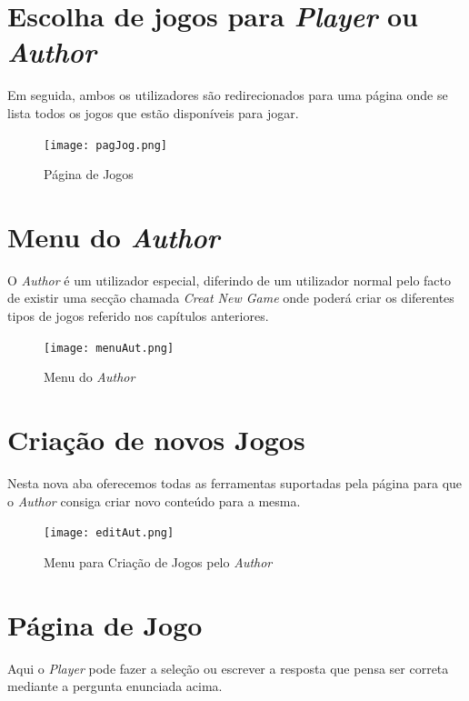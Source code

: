 \documentclass[11pt,a4paper]{report}
\begin{document}
\section{Escolha de jogos para \emph{Player} ou \emph{Author}}
Em seguida, ambos os utilizadores são redirecionados para uma página onde se lista todos os jogos que estão disponíveis para jogar.\newline\newline

\begin{figure}[h]
    \centering
    \texttt{[image: pagJog.png]}
    \caption{Página de Jogos}
    \label{fig:pagJog}
\end{figure}

\newpage

\section{Menu do \emph{Author}}
O \emph{Author} é um utilizador especial, diferindo de um utilizador normal pelo facto de existir uma secção chamada \emph{Creat New Game} onde poderá criar os diferentes tipos de jogos referido nos capítulos anteriores.\newline\newline

\begin{figure}[h]
    \centering
    \texttt{[image: menuAut.png]}
    \caption{Menu do \emph{Author}}
    \label{fig:menuAut}
\end{figure}

\section{Criação de novos Jogos}
Nesta nova aba oferecemos todas as ferramentas suportadas pela página para que o \emph{Author} consiga criar novo conteúdo para a mesma.\newline\newline

\begin{figure}[h]
    \centering
    \texttt{[image: editAut.png]}
    \caption{Menu para Criação de Jogos pelo \emph{Author}}
    \label{fig:editAut}
\end{figure}

\newpage

\section{Página de Jogo}
Aqui o \emph{Player} pode fazer a seleção ou escrever a resposta que pensa ser correta mediante a pergunta enunciada acima.
\end{document}
